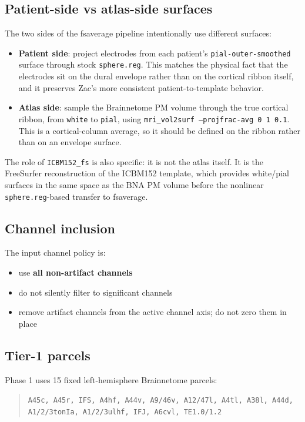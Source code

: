 \documentclass[11pt,letterpaper]{article}
\begin{document}
\subsection{Patient-side vs atlas-side surfaces}

The two sides of the fsaverage pipeline intentionally use different surfaces:
\begin{itemize}[leftmargin=2em, itemsep=0.2em]
\item \textbf{Patient side}: project electrodes from each patient's \texttt{pial-outer-smoothed} surface through stock \texttt{sphere.reg}. This matches the physical fact that the electrodes sit on the dural envelope rather than on the cortical ribbon itself, and it preserves Zac's more consistent patient-to-template behavior.
\item \textbf{Atlas side}: sample the Brainnetome PM volume through the true cortical ribbon, from \texttt{white} to \texttt{pial}, using \texttt{mri\_vol2surf --projfrac-avg 0 1 0.1}. This is a cortical-column average, so it should be defined on the ribbon rather than on an envelope surface.
\end{itemize}

The role of \texttt{ICBM152\_fs} is also specific: it is not the atlas itself. It is the FreeSurfer reconstruction of the ICBM152 template, which provides white/pial surfaces in the same space as the BNA PM volume before the nonlinear \texttt{sphere.reg}-based transfer to fsaverage.

\subsection{Channel inclusion}

The input channel policy is:
\begin{itemize}[leftmargin=2em, itemsep=0.2em]
\item use \textbf{all non-artifact channels}
\item do not silently filter to significant channels
\item remove artifact channels from the active channel axis; do not zero them in place
\end{itemize}

\subsection{Tier-1 parcels}

Phase 1 uses 15 fixed left-hemisphere Brainnetome parcels:
\begin{quote}
\texttt{A45c, A45r, IFS, A4hf, A44v, A9/46v, A12/47l, A4tl, A38l, A44d, A1/2/3tonIa, A1/2/3ulhf, IFJ, A6cvl, TE1.0/1.2}
\end{quote}
\end{document}
